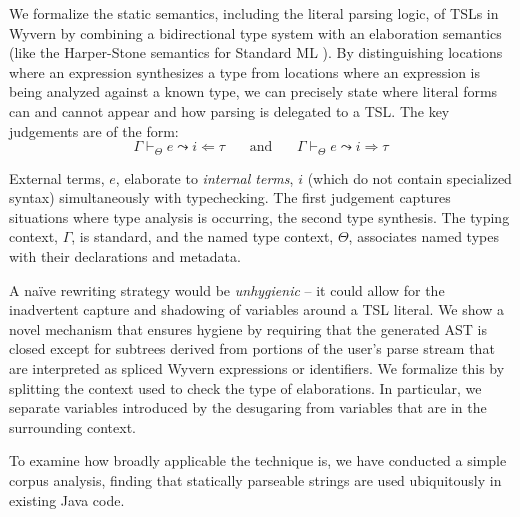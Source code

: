 \begin{contribution}\label{cont:TSL-semantics}
We formalize the static semantics, including the literal parsing logic, of TSLs in Wyvern by combining a bidirectional type system \cite{Pierce:2000:LTI:345099.345100}  with an elaboration semantics (like the Harper-Stone semantics for Standard ML \cite{Harper00atype-theoretic}). By distinguishing locations where an expression synthesizes a type from locations where an expression is being analyzed against a known type, we can precisely state where literal forms can and cannot appear and how parsing is delegated to a TSL. The key judgements are of the form:
\[\Gamma \vdash_\Theta e \leadsto i \Leftarrow \tau~~~~~~~~\text{and}~~~~~~~~\Gamma \vdash_\Theta e  \leadsto i \Rightarrow \tau\]

External terms, $e$, elaborate to \emph{internal terms}, $i$ (which do not contain specialized syntax) simultaneously with typechecking. The first judgement captures situations where type analysis is occurring, the second type synthesis. The typing context, $\Gamma$, is standard, and the named type context, $\Theta$, associates named types with their declarations and metadata. 
\end{contribution}

\begin{contribution}\label{cont:TSL-hygiene}
 A na\"ive rewriting strategy would be \emph{unhygienic} -- it could allow for the inadvertent capture and shadowing of variables around a TSL literal. We show a novel mechanism that ensures hygiene by requiring that the generated AST is closed except for subtrees derived from portions of the user's parse stream that are interpreted as spliced Wyvern expressions or identifiers. We formalize this by splitting the context used to check the type of elaborations. In particular, we separate  variables introduced by the desugaring from variables that are in the surrounding context. %
\end{contribution}


\begin{contribution}\label{cont:TSL-study}
To examine how broadly applicable the technique is, we have conducted a simple corpus analysis, finding that statically parseable strings are used ubiquitously in existing Java code.
\end{contribution}

